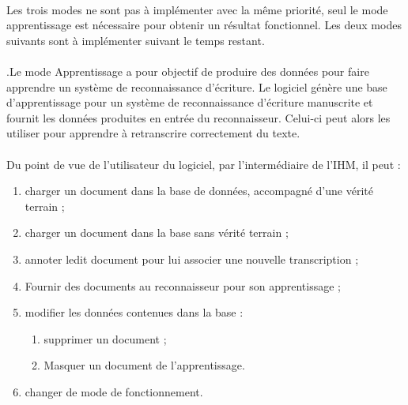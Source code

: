 \paragraph{}
Les trois modes ne sont pas à implémenter avec la même priorité, seul le mode
apprentissage est nécessaire pour obtenir un résultat fonctionnel. Les deux
modes suivants sont à implémenter suivant le temps restant.

\paragraph{}
.Le mode Apprentissage a pour objectif de produire des données pour faire apprendre un système de reconnaissance d’écriture. 
Le logiciel génère une base d’apprentissage pour un
système de reconnaissance d’écriture manuscrite et fournit les données
produites en entrée du reconnaisseur. Celui-ci peut alors les utiliser pour
apprendre à retranscrire correctement du texte.

\paragraph{}
Du point de vue de l'utilisateur du logiciel, par l’intermédiaire de l’IHM, il
peut :
\begin{enumerate}
\item charger un document dans la base de données, accompagné d’une vérité
terrain ;
\item charger un document dans la base sans vérité terrain ;
\item annoter ledit document pour lui associer une nouvelle transcription ;
\item Fournir des documents au reconnaisseur pour son apprentissage ;
\item modifier les données contenues dans la base :
\begin{enumerate}
\item supprimer un document ;
\item Masquer un document de l’apprentissage.
\end{enumerate}
\item changer de mode de fonctionnement.
\end{enumerate}

\newpage

